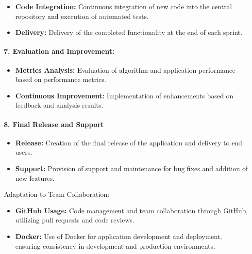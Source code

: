 \documentclass[unnumsec,webpdf,contemporary,large]{oup-authoring-template}%
\theoremstyle{thmstyleone}%
\theoremstyle{thmstyletwo}%
\theoremstyle{thmstylethree}%
\begin{document}
\begin{itemize}
    \item \textbf{Code Integration:} Continuous integration of new code into the central repository and execution of automated tests.
    \item \textbf{Delivery:} Delivery of the completed functionality at the end of each sprint.
\end{itemize}
\vspace{0.1cm}

\paragraph{7. Evaluation and Improvement:}
\vspace{0.2cm}

\begin{itemize}
    \item \textbf{Metrics Analysis:} Evaluation of algorithm and application performance based on performance metrics.
    \item \textbf{Continuous Improvement:} Implementation of enhancements based on feedback and analysis results.
\end{itemize}
\vspace{0.1cm}

\paragraph{8. Final Release and Support}
\vspace{0.2cm}

\begin{itemize}
    \item \textbf{Release:} Creation of the final release of the application and delivery to end users.
    \item \textbf{Support:} Provision of support and maintenance for bug fixes and addition of new features.
\end{itemize}
\vspace{0.1cm}

Adaptation to Team Collaboration:

\begin{itemize}
    \item \textbf{GitHub Usage:} Code management and team collaboration through GitHub, utilizing pull requests and code reviews.
   \item \textbf{Docker:} Use of Docker for application development and deployment, ensuring consistency in development and production environments.
\end{itemize}
\end{document}
